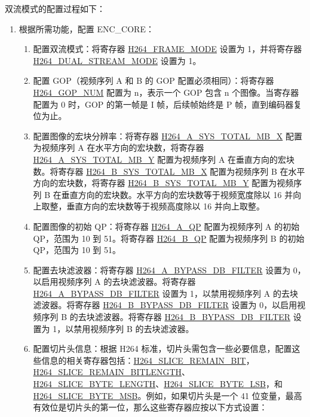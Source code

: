 \documentclass[main\_\_CN.tex]{subfiles}
\begin{document}
双流模式的配置过程如下：
\begin{enumerate}
    \item\label{item:h264-dual-cfg} 根据所需功能，配置 ENC\_CORE：
    \begin{enumerate}
        \item 配置双流模式：将寄存器 \hyperref[fielddesc:H264FRAMEMODE]{H264\_FRAME\_MODE} 设置为 1，并将寄存器 \hyperref[fielddesc:H264DUALSTREAMMODE]{H264\_DUAL\_STREAM\_MODE} 设置为 1。
        \item 配置 GOP（视频序列 A 和 B 的 GOP 配置必须相同）：将寄存器 \hyperref[fielddesc:H264GOPNUM]{H264\_GOP\_NUM} 配置为 n，表示一个 GOP 包含 n 个图像。当寄存器配置为 0 时，GOP 的第一帧是 I 帧，后续帧始终是 P 帧，直到编码器复位为止。
        \item 配置图像的宏块分辨率：将寄存器 \hyperref[fielddesc:H264ASYSTOTALMBX]{H264\_A\_SYS\_TOTAL\_MB\_X} 配置为视频序列 A 在水平方向的宏块数，将寄存器 \hyperref[fielddesc:H264ASYSTOTALMBY]{H264\_A\_SYS\_TOTAL\_MB\_Y} 配置为视频序列 A 在垂直方向的宏块数。将寄存器 \hyperref[fielddesc:H264BSYSTOTALMBX]{H264\_B\_SYS\_TOTAL\_MB\_X} 配置为视频序列 B 在水平方向的宏块数，将寄存器 \hyperref[fielddesc:H264BSYSTOTALMBY]{H264\_B\_SYS\_TOTAL\_MB\_Y} 配置为视频序列 B 在垂直方向的宏块数。水平方向的宏块数等于视频宽度除以 16 并向上取整，垂直方向的宏块数等于视频高度除以 16 并向上取整。
        \item 配置图像的初始 QP：将寄存器 \hyperref[fielddesc:H264AQP]{H264\_A\_QP} 配置为视频序列 A 的初始 QP，范围为 10 到 51。将寄存器 \hyperref[fielddesc:H264BQP]{H264\_B\_QP} 配置为视频序列 B 的初始 QP，范围为 10 到 51。
        \item 配置去块滤波器：将寄存器 \hyperref[fielddesc:H264ABYPASSDBFILTER]{H264\_A\_BYPASS\_DB\_FILTER} 设置为 0，以启用视频序列 A 的去块滤波器。将寄存器 \hyperref[fielddesc:H264ABYPASSDBFILTER]{H264\_A\_BYPASS\_DB\_FILTER} 设置为 1，以禁用视频序列 A 的去块滤波器。将寄存器 \hyperref[fielddesc:H264BBYPASSDBFILTER]{H264\_B\_BYPASS\_DB\_FILTER} 设置为 0，以启用视频序列 B 的去块滤波器。将寄存器 \hyperref[fielddesc:H264BBYPASSDBFILTER]{H264\_B\_BYPASS\_DB\_FILTER} 设置为 1，以禁用视频序列 B 的去块滤波器。
        \item 配置切片头信息：根据 H264 标准，切片头需包含一些必要信息，配置这些信息的相关寄存器包括：\hyperref[fielddesc:H264SLICEREMAINBIT]{H264\_SLICE\_REMAIN\_BIT}，\hyperref[fielddesc:H264SLICEREMAINBITLENGTH]{H264\_SLICE\_REMAIN\_BITLENGTH}、\hyperref[fielddesc:H264SLICEBYTELENGTH]{H264\_SLICE\_BYTE\_LENGTH}、\hyperref[fielddesc:H264SLICEBYTELSB]{H264\_SLICE\_BYTE\_LSB}，和 \hyperref[fielddesc:H264SLICEBYTEMSB]{H264\_SLICE\_BYTE\_MSB}。例如，如果切片头是一个 41 位变量，最高有效位是切片头的第一位，那么这些寄存器应按以下方式设置：

\end{enumerate}
\end{enumerate}
\end{document}
